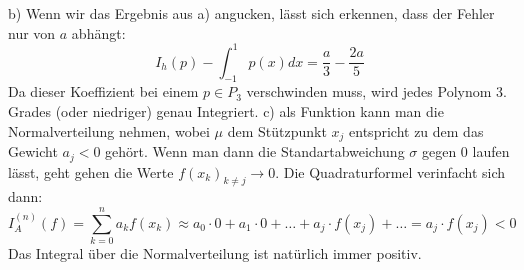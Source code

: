 \documentclass[11pt a4paper]{article}
\begin{document}
\newline
b) Wenn wir das Ergebnis aus a) angucken, lässt 
sich erkennen, dass der Fehler 
nur von $a$ abhängt:
\[
	I_h(p) - \int_{-1}^1 p(x) dx= \frac a3 - \frac{2a}{5}
\]
Da dieser Koeffizient bei einem $p \in P_3$ verschwinden muss, wird 
jedes Polynom 3. Grades (oder niedriger) genau Integriert.
\newline
\vspace{0.5cm}
\newline
c) als Funktion kann man die Normalverteilung nehmen, wobei $\mu$ dem 
Stützpunkt $x_j$ entspricht zu dem das Gewicht $a_j < 0$ gehört.
\newline
Wenn man dann die Standartabweichung $\sigma$ gegen 0 laufen lässt, geht
gehen die Werte $f(x_k)_{k\neq j} \rightarrow 0$. Die Quadraturformel 
verinfacht sich dann:
\[
	I_A^{(n)} (f) = \sum_{k=0}^n a_k f(x_k) \approx
	a_0 \cdot 0 + a_1 \cdot 0 + \hdots + a_j \cdot f(x_j) + \hdots =
	a_j \cdot f(x_j) < 0
\]
Das Integral über die Normalverteilung ist natürlich immer positiv.
\end{document}
